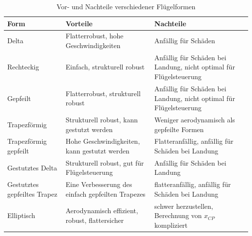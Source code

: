 \begin{table}[H]
    \centering
    \begin{tabular}{|m{2.8cm}|m{5.8cm}|m{5.8cm}|}
        \hline
        \textbf{Form} & \textbf{Vorteile} & \textbf{Nachteile} \\
        \hline
        Delta & Flatterrobust, hohe Geschwindigkeiten & Anfällig für Schäden \\
        \hline
        Rechteckig & Einfach, strukturell robust & Anfällig für Schäden bei Landung, nicht optimal für Flügelsteuerung \\
        \hline
        Gepfeilt & Flatterrobust, strukturell robust & Anfällig für Schäden bei Landung, nicht optimal für Flügelsteuerung\\
        \hline
        Trapezförmig & Strukturell robust, kann gestutzt werden & Weniger aerodynamisch als gepfeilte Formen \\
        \hline
        Trapezförmig gepfeilt & Hohe Geschwindigkeiten, kann gestutzt werden & Flatteranfällig, anfällig für Schäden bei Landung \\
        \hline
        Gestutztes Delta & Strukturell robust, gut für Flügelsteuerung & Anfällig für Schäden bei Landung \\
        \hline
        Gestutztes gepfeiltes Trapez & Eine Verbesserung des einfach gepfeilten Trapezes & flatteranfällig, anfällig für Schäden bei Landung \\
        \hline
        Elliptisch & Aerodynamisch effizient, robust, flattersicher & schwer herzustellen, Berechnung von $x_{CP}$ kompliziert \\
        \hline
    \end{tabular}
    \caption{Vor- und Nachteile verschiedener Flügelformen}
    \label{tab:fin_shapes}
\end{table}

